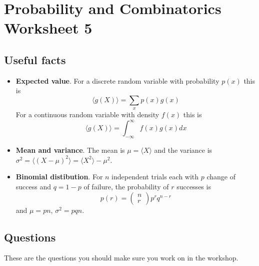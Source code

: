 \documentclass[11pt,a4paper]{scrartcl}
\begin{document}
\section*{Probability and Combinatorics Worksheet 5}

\subsection*{Useful facts}

\begin{itemize}

\item \textbf{Expected value}. For a discrete random variable with probability $p(x)$ this is
\begin{equation}
\langle g(X) \rangle = \sum_x p(x)g(x)
\end{equation}
For a continuous random variable with density $f(x)$ this is
\begin{equation}
\langle g(X)\rangle = \int_{-\infty}^\infty{f(x)g(x)}dx
\end{equation}


\item \textbf{Mean and variance}. The mean is $\mu=\langle X\rangle$ and the variance is $\sigma^2=\langle(X-\mu)^2\rangle=\langle X^2\rangle - \mu^2$.

\item \textbf{Binomial distibution}. For $n$ independent trials each with $p$ change of success and $q=1-p$ of failure, the probability of $r$ successes is 
\begin{equation}
p(r)=\left(\begin{array}{c}n\\r\end{array}\right)p^rq^{n-r}
\end{equation}
and $\mu=pn$, $\sigma^2=pqn$.

\end{itemize}



\subsection*{Questions}

These are the questions you should make sure you work on in the workshop.
\end{document}
